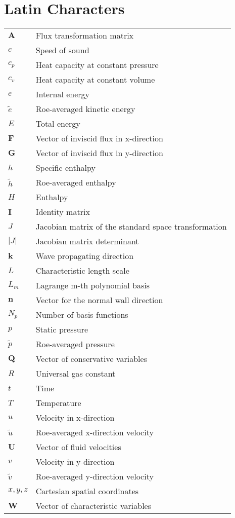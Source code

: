 \section*{Latin Characters}
\begin{longtable}{ll}
$\textbf{A}$ & Flux transformation matrix \\
$c$ & Speed of sound \\
$c_{p}$ & Heat capacity at constant pressure \\
$c_{v}$ & Heat capacity at constant volume \\ 
$e$ & Internal energy \\
$\tilde{e}$ & Roe-averaged kinetic energy \\
$E$ & Total energy \\
$\textbf{F}$ & Vector of inviscid flux in x-direction \\
$\textbf{G}$ & Vector of inviscid flux in y-direction \\
$h$ & Specific enthalpy \\
$\tilde{h}$ & Roe-averaged enthalpy \\
$H$ & Enthalpy \\
$\textbf{I}$ & Identity matrix \\
$J$ & Jacobian matrix of the standard space transformation \\
$|J|$ & Jacobian matrix determinant \\
$\textbf{\^{k}}$ & Wave propagating direction \\
$L$ & Characteristic length scale \\
$L_{m}$ & Lagrange m-th polynomial basis \\
$\textbf{n}$ & Vector for the normal wall direction \\
$N_p$ & Number of basis functions \\
$p$ & Static pressure \\
$\tilde{p}$ & Roe-averaged pressure \\
$\textbf{Q}$ & Vector of conservative variables \\
$R$ & Universal gas constant \\
$t$ & Time \\
$T$ & Temperature \\
$u$ & Velocity in x-direction \\
$\tilde{u}$ & Roe-averaged x-direction velocity \\
$\textbf{U}$ & Vector of fluid velocities \\
$v$ & Velocity in y-direction \\
$\tilde{v}$ & Roe-averaged y-direction velocity \\
$x, y, z$ & Cartesian spatial coordinates \\
$\textbf{W}$ & Vector of characteristic variables \\
\end{longtable}

